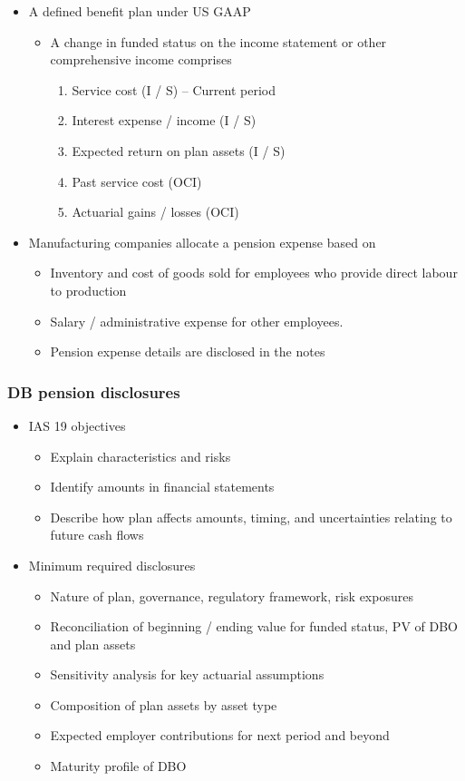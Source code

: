 \documentclass[../notes_compiled.tex]{subfiles}
\begin{document}
\begin{itemize}
\item A defined benefit plan under US GAAP
\begin{itemize}
\item A change in funded status on the income statement or other comprehensive income comprises
\begin{enumerate}
\item Service cost (I / S) -- Current period
\item Interest expense / income (I / S)
\item Expected return on plan assets (I / S)
\item Past service cost (OCI)
\item Actuarial gains / losses (OCI)
\end{enumerate}
\end{itemize}
\item Manufacturing companies allocate a pension expense based on
\begin{itemize}
\item Inventory and cost of goods sold for employees who provide direct labour to production
\item Salary / administrative expense for other employees.
\item Pension expense details are disclosed in the notes
\end{itemize}
\end{itemize}

\subsubsection{DB pension disclosures}
\begin{itemize}
\item IAS 19 objectives
\begin{itemize}
\item Explain characteristics and risks
\item Identify amounts in financial statements
\item Describe how plan affects amounts, timing, and uncertainties relating to future cash flows
\end{itemize}
\item Minimum required disclosures
\begin{itemize}
\item Nature of plan, governance, regulatory framework, risk exposures
\item Reconciliation of beginning / ending value for funded status, PV of DBO and plan assets
\item Sensitivity analysis for key actuarial assumptions
\item Composition of plan assets by asset type
\item Expected employer contributions for next period and beyond
\item Maturity profile of DBO
\end{itemize}

\end{itemize}
\end{document}
